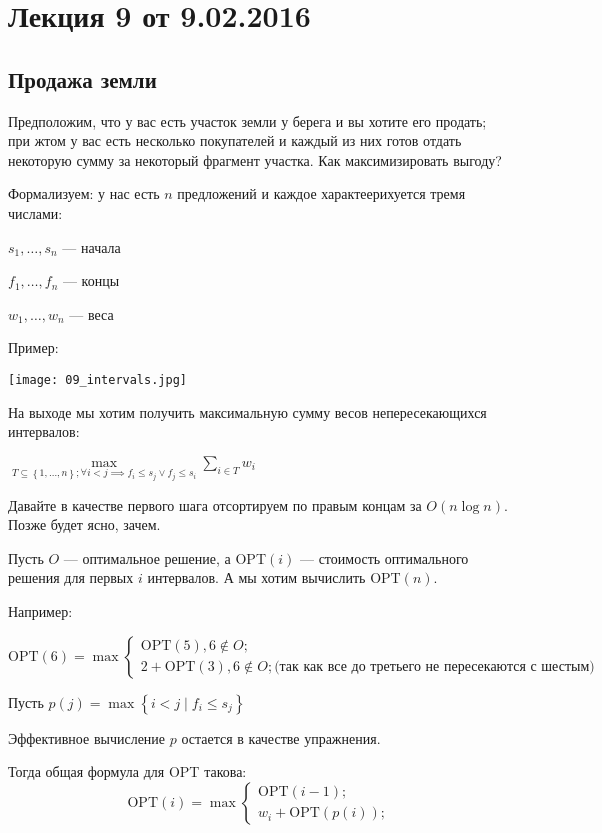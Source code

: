



\section*{Лекция 9 от 9.02.2016}

\subsection{Продажа земли}

Предположим, что у вас есть участок земли у берега и вы хотите его продать; при жтом у вас есть несколько покупателей и каждый из них готов отдать некоторую сумму за некоторый фрагмент участка. Как максимизировать выгоду?

Формализуем: у нас есть $n$ предложений и каждое характеерихуется тремя числами:

$s_1, \ldots, s_n$ --- начала

$f_1, \ldots, f_n$ --- концы

$w_1, \ldots, w_n$ --- веса

Пример:

\texttt{[image: 09\_intervals.jpg]}

На выходе мы хотим получить максимальную сумму весов непересекающихся интервалов:

$\max\limits_{T\subseteq \left\{ 1,\ldots, n \right\}; \forall i<j \implies f_i \leqslant s_j \lor f_j \leqslant s_i} \sum\limits_{i\in T}w_i$

Давайте в качестве первого шага отсортируем по правым концам за $O(n\log n)$. Позже будет ясно, зачем.

Пусть $O$ --- оптимальное решение, а OPT$(i)$ --- стоимость оптимального решения для первых $i$ интервалов. А мы хотим вычислить OPT$(n)$.

Например:

\[
    \mathrm{OPT}(6) = \max\begin{cases}
        \mathrm{OPT}(5), 6\not\in O;\\
        2+ \mathrm{OPT}(3), 6\not\in O; \text{(так как все до третьего не пересекаются с шестым)}
    \end{cases}
\]

Пусть $p(j) = \max\left\{ i<j \mid f_{i}\leqslant s_j\right\}$

Эффективное вычисление $p$ остается в качестве упражнения.

Тогда общая формула для OPT такова:
\[
    \mathrm{OPT}(i) = \max\begin{cases}
        \mathrm{OPT}(i-1);\\
        w_i+ \mathrm{OPT}(p(i));
    \end{cases}
\]

